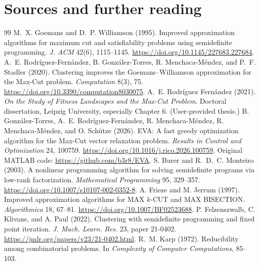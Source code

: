 \documentclass[10pt,letterpaper]{article}
\begin{document}
\section*{Sources and further reading}
\begin{thebibliography}{99}\setlength{\itemsep}{2pt}
 M.~X. Goemans and D.~P. Williamson (1995). Improved approximation algorithms for maximum cut and satisfiability problems using semidefinite programming. \emph{J. ACM} 42(6), 1115--1145. \url{https://doi.org/10.1145/227683.227684}.
 A.~E. Rodr\'iguez-Fern\'andez, B. Gonz\'alez-Torres, R. Menchaca-M\'endez, and P.~F. Stadler (2020). Clustering improves the Goemans--Williamson approximation for the Max-Cut problem. \emph{Computation} 8(3), 75. \url{https://doi.org/10.3390/computation8030075}.
 A.~E. Rodr\'iguez Fern\'andez (2021). \emph{On the Study of Fitness Landscapes and the Max-Cut Problem}. Doctoral dissertation, Leipzig University, especially Chapter 6. (User-provided thesis.)
 B. Gonz\'alez-Torres, A.~E. Rodr\'iguez-Fern\'andez, R. Menchaca-M\'endez, R. Menchaca-M\'endez, and O. Sch\"utze (2026). EVA: A fast greedy optimization algorithm for the Max-Cut vector relaxation problem. \emph{Results in Control and Optimization} 24, 100759. \url{https://doi.org/10.1016/j.rico.2026.100759}. Original MATLAB code: \url{https://github.com/b3r8/EVA}.
 S. Burer and R.~D.~C. Monteiro (2003). A nonlinear programming algorithm for solving semidefinite programs via low-rank factorization. \emph{Mathematical Programming} 95, 329--357. \url{https://doi.org/10.1007/s10107-002-0352-8}.
 A. Frieze and M. Jerrum (1997). Improved approximation algorithms for MAX $k$-CUT and MAX BISECTION. \emph{Algorithmica} 18, 67--81. \url{https://doi.org/10.1007/BF02523688}.
 P. Felzenszwalb, C. Klivans, and A. Paul (2022). Clustering with semidefinite programming and fixed point iteration. \emph{J. Mach. Learn. Res.} 23, paper 21-0402. \url{https://jmlr.org/papers/v23/21-0402.html}.
 R.~M. Karp (1972). Reducibility among combinatorial problems. In \emph{Complexity of Computer Computations}, 85--103.
\end{thebibliography}
\end{document}
